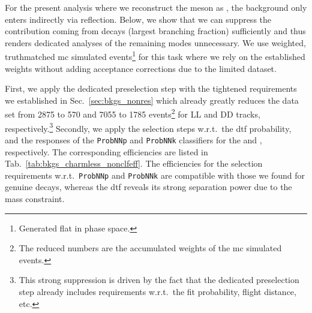 For the present analysis where we reconstruct the \Dz meson as \decay{\Dz}{\Km\pip}, the \decay{\Lb}{\Lz\Kp\Km} background only enters indirectly via \gls{reflection}.
Below, we show that we can suppress the contribution coming from \decay{\Lb}{\Lz\Kp\Km} decays (largest branching fraction) sufficiently and thus renders dedicated analyses of the remaining  modes unnecessary.
We use weighted, \gls{truthmatched} \gls{mc} simulated events\footnote{Generated flat in phase space.} for this task where we rely on the established weights without adding acceptance corrections due to the limited dataset.

First, we apply the dedicated \decay{\Lb}{\Dz\Lz} preselection step with the tightened requirements we established in Sec.~\ref{sec:bkgs_nonres} which already greatly reduces the \decay{\Lb}{\Lz\Kp\Km} data set from \num{2875} to \num{570} and \num{7055} to \num{1785} events\footnote{The reduced numbers are the accumulated weights of the \gls{mc} simulated events.} for \gls{LL} and \gls{DD} tracks, respectively.\footnote{This strong suppression is driven by the fact that the dedicated \decay{\Lb}{\Dz\Lz} preselection step already includes requirements w.r.t.\ the fit probability, \Dz flight distance, etc.}
Secondly, we apply the selection steps w.r.t.\ the \gls{dtf} probability, and the responses of the \texttt{ProbNNp} and \texttt{ProbNNk} classifiers for the \proton and \Km, respectively.
The corresponding efficiencies are listed in Tab.~\ref{tab:bkgs_charmless_nonclfeff}.
The efficiencies for the selection requirements w.r.t.\ \texttt{ProbNNp} and \texttt{ProbNNk} are compatible with those we found for genuine \decay{\Lb}{\Dz\Lz} decays, whereas the \gls{dtf} reveals its strong separation power due to the \Dz mass constraint.
